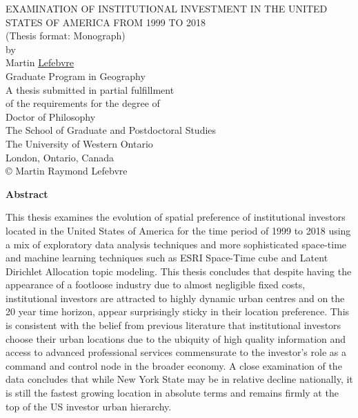 \documentclass[12pt,letterpaper]{book}
\makeatletter
\numberwithin{figure}{chapter}
\newenvironment{preliminary}%
{\pagestyle{plain}\pagenumbering{roman}}%
{\pagenumbering{arabic}}
\newcommand\isdefinedspinetitle[1]{%
  \edef\@tempa{#1}%
  \def\@tempb{}%
  \ifx\@tempa\@tempb
	\else (Spine title: #1)\\
  \fi
}
\newcommand\coauthor[1]{%
  \edef\@tempa{#1}%
  \def\@tempb{}%
  \ifx\@tempa\@tempb
	\else \newpage \Large Co-Authorship Statement\normalsize\\\indent\\#1\\
  \fi
}
\newcommand\acknowlege[1]{%
  \edef\@tempa{#1}%
  \def\@tempb{}%
  \ifx\@tempa\@tempb
	\else \newpage \Large Acknowlegements\normalsize\\\indent\\#1\newpage
  \fi
}
\newcommand{\department}{Geography}
\newcommand{\degree}{Doctor of Philosophy}
\newcommand{\firstname}{Martin}
\newcommand{\middlename}{Raymond}
\newcommand{\lastname}{Lefebvre}
\newcommand{\authorname}{{\firstname} {\middlename} {\lastname}}
\newcommand{\titl}{Examination of Institutional Investment in the United States of America from 1999 to 2018}
\newcommand{\thesisformat}{Monograph} %
\newcommand{\gyear}{\number\year}
\newcommand{\makecoauthor}{

}
\newcommand{\makeacknowlege} {
\Large\begin{center}\textbf{Acknowlegement}\end{center}\normalsize

\begin{spacing}{2}
I would like to express my very great appreciation to Dr Milford B. Green for his valuable and constructive suggestions during the planning and development of this research work. His willingness to give his time so generously over this project and my previous works has been very much appreciated. \newline
  
I would like to acknowledge the support and encouragement provided by my family during the preparation of this project. Without their help, editing the document would have been a unbearable and the finished product would have been less clear and concise.     
\end{spacing}  
}
\renewcommand{\maketitle}
{\begin{titlepage}
   \setcounter{page}{1}
\begin{spacing}{1} 
   \begin{large}
   \begin{center}
      \mbox{}
      \vfill
      {\MakeUppercase{\titl}}\\
      (Thesis format: \thesisformat)\\
      \vfill
      by \\
      \vfill
      {\firstname} \underline{\lastname}\\
      \vfill
      Graduate Program in {\department}\\
      \vfill
		A thesis submitted in partial fulfillment\\
		of the requirements for the degree of\\
		\degree\\
		\vfill
		The School of Graduate and Postdoctoral Studies\\
		The University of Western Ontario\\
		London, Ontario, Canada\\
		\vfill
      {\copyright} {\authorname} {\gyear}  \\
      \vspace*{.2in}
   \end{center}
   \end{large}
  \end{spacing}
   \end{titlepage}

}%
\makeatother
\begin{document}


\begin{preliminary}

\maketitle
{}
\newpage

{}
\Large\begin{center}\textbf{Abstract}\end{center}\normalsize
\begin{spacing}{2}
\setcounter{page}{2}


This thesis examines the evolution of spatial preference of institutional investors located in the United States of America for the time period of 1999 to 2018 using a mix of exploratory data analysis techniques and more sophisticated space-time and machine learning techniques such as ESRI Space-Time cube and Latent Dirichlet Allocation topic modeling.  This thesis concludes that despite having the appearance of a footloose industry due to almost negligible fixed costs, institutional investors are attracted to highly dynamic urban centres and on the 20 year time horizon, appear surprisingly sticky in their location preference. This is consistent with the belief from previous literature that institutional investors choose their urban locations due to the ubiquity of high quality information and access to advanced professional services commensurate to the investor's role as a command and control node in the broader economy. A close examination of the data concludes that while New York State may be in relative decline nationally, it is still the fastest growing location in absolute terms and remains firmly at the top of the US investor urban hierarchy. 


\end{spacing}
\end{preliminary}
\end{document}
